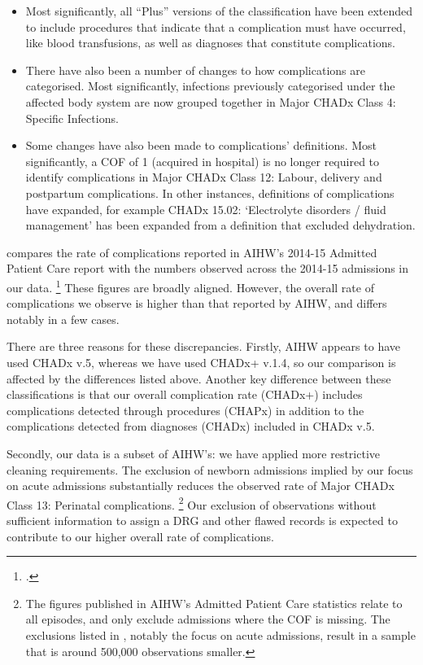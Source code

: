 \documentclass[submission]{grattan}
\begin{document}
\begin{itemize}
\item
  Most significantly, all ``Plus'' versions of the classification have been extended to include procedures that indicate that a complication must have occurred, like blood transfusions, as well as diagnoses that constitute complications.
\item
  There have also been a number of changes to how complications are categorised.
Most significantly, infections previously categorised under the affected body system are now grouped together in Major CHADx Class 4: Specific Infections.
\item
  Some changes have also been made to complications' definitions.
Most significantly, a COF of 1 (acquired in hospital) is no longer required to identify complications in Major CHADx Class 12: Labour, delivery and postpartum complications.
In other instances, definitions of complications have expanded, for example CHADx 15.02: `Electrolyte disorders / fluid management' has been expanded from a definition that excluded dehydration.
\end{itemize}

 compares the rate of complications reported in AIHW's 2014-15 Admitted Patient Care report with the numbers observed across the 2014-15 admissions in our data.%
	\footcite{AIHW-hospital-2014-15}
These figures are broadly aligned.
However, the overall rate of complications we observe is higher than that reported by AIHW, and differs notably in a few cases.

There are three reasons for these discrepancies.
Firstly, AIHW appears to have used CHADx v.5, whereas we have used CHADx+ v.1.4, so our comparison is affected by the differences listed above.
Another key difference between these classifications is that our overall complication rate (CHADx+) includes complications detected through procedures (CHAPx) in addition to the complications detected from diagnoses (CHADx) included in CHADx v.5.

Secondly, our data is a subset of AIHW's: we have applied more restrictive cleaning requirements.
The exclusion of newborn admissions implied by our focus on acute admissions substantially reduces the observed rate of Major CHADx Class 13: Perinatal complications.%
	\footnote{The figures published in AIHW's Admitted Patient Care statistics relate to all episodes, and only exclude admissions where the COF is missing.
	The exclusions listed in , notably the focus on acute admissions, result in a sample that is around 500,000 observations smaller.}
Our exclusion of observations without sufficient information to assign a DRG and other flawed records is expected to contribute to our higher overall rate of complications.
\end{document}
